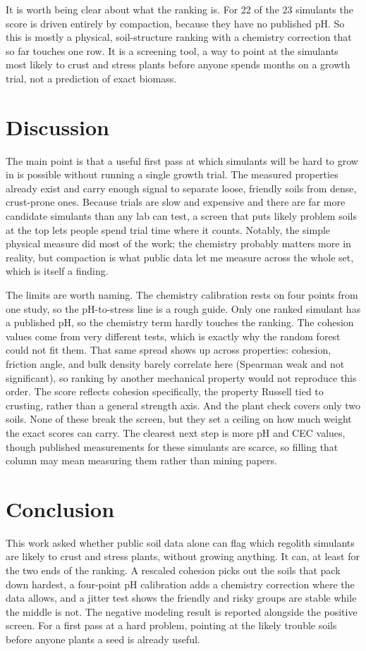 \documentclass[conference,letterpaper,10pt]{IEEEtran}
\begin{document}
It is worth being clear about what the ranking is. For 22 of the 23 simulants the score is driven entirely by compaction, because they have no published pH. So this is mostly a physical, soil-structure ranking with a chemistry correction that so far touches one row. It is a screening tool, a way to point at the simulants most likely to crust and stress plants before anyone spends months on a growth trial, not a prediction of exact biomass.

\section{Discussion}
The main point is that a useful first pass at which simulants will be hard to grow in is possible without running a single growth trial. The measured properties already exist and carry enough signal to separate loose, friendly soils from dense, crust-prone ones. Because trials are slow and expensive and there are far more candidate simulants than any lab can test, a screen that puts likely problem soils at the top lets people spend trial time where it counts. Notably, the simple physical measure did most of the work; the chemistry probably matters more in reality, but compaction is what public data let me measure across the whole set, which is itself a finding.

The limits are worth naming. The chemistry calibration rests on four points from one study, so the pH-to-stress line is a rough guide. Only one ranked simulant has a published pH, so the chemistry term hardly touches the ranking. The cohesion values come from very different tests, which is exactly why the random forest could not fit them. That same spread shows up across properties: cohesion, friction angle, and bulk density barely correlate here (Spearman weak and not significant), so ranking by another mechanical property would not reproduce this order. The score reflects cohesion specifically, the property Russell tied to crusting, rather than a general strength axis. And the plant check covers only two soils. None of these break the screen, but they set a ceiling on how much weight the exact scores can carry. The clearest next step is more pH and CEC values, though published measurements for these simulants are scarce, so filling that column may mean measuring them rather than mining papers.

\section{Conclusion}
This work asked whether public soil data alone can flag which regolith simulants are likely to crust and stress plants, without growing anything. It can, at least for the two ends of the ranking. A rescaled cohesion picks out the soils that pack down hardest, a four-point pH calibration adds a chemistry correction where the data allows, and a jitter test shows the friendly and risky groups are stable while the middle is not. The negative modeling result is reported alongside the positive screen. For a first pass at a hard problem, pointing at the likely trouble soils before anyone plants a seed is already useful.
\end{document}
